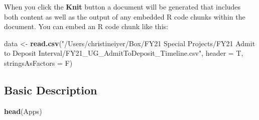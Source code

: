\documentclass[]{article}
\newenvironment{Shaded}{\begin{snugshade}}{\end{snugshade}}
\newcommand{\KeywordTok}[1]{\textcolor[rgb]{0.13,0.29,0.53}{\textbf{#1}}}
\newcommand{\DataTypeTok}[1]{\textcolor[rgb]{0.13,0.29,0.53}{#1}}
\newcommand{\StringTok}[1]{\textcolor[rgb]{0.31,0.60,0.02}{#1}}
\newcommand{\OperatorTok}[1]{\textcolor[rgb]{0.81,0.36,0.00}{\textbf{#1}}}
\newcommand{\NormalTok}[1]{#1}
\begin{document}
When you click the \textbf{Knit} button a document will be generated
that includes both content as well as the output of any embedded R code
chunks within the document. You can embed an R code chunk like this:

\begin{Shaded}
\begin{Highlighting}[]
\NormalTok{data <-}\StringTok{ }\KeywordTok{read.csv}\NormalTok{(}\StringTok{"/Users/christineiyer/Box/FY21 Special Projects/FY21 Admit to Deposit Interval/FY21_UG_AdmitToDeposit_Timeline.csv"}\NormalTok{, }\DataTypeTok{header =}\NormalTok{ T, }\DataTypeTok{stringsAsFactors =}\NormalTok{ F)}
\end{Highlighting}
\end{Shaded}

\subsection{Basic Description}\label{basic-description}

\begin{Shaded}
\end{Shaded}

\begin{Shaded}
\begin{Highlighting}[]
\KeywordTok{head}\NormalTok{(Apps)}
\end{Highlighting}
\end{Shaded}
\end{document}
